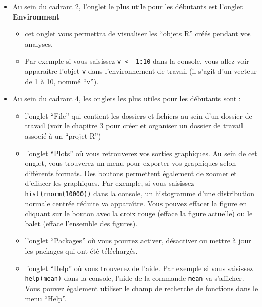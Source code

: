\documentclass[
]{book}
\providecommand{\tightlist}{%
  \setlength{\itemsep}{0pt}\setlength{\parskip}{0pt}}
\begin{document}
\begin{itemize}
\tightlist
\item
  Au sein du cadrant 2, l'onglet le plus utile pour les débutants est l'onglet \textbf{Environment}

  \begin{itemize}
  \tightlist
  \item
    cet onglet vous permettra de visualiser les ``objets R'' créés pendant vos analyses.
  \item
    Par exemple si vous saisissez \texttt{v\ \textless{}-\ 1:10} dans la console, vous allez voir apparaître l'objet \texttt{v} dans l'environnement de travail (il s'agit d'un vecteur de 1 à 10, nommé ``v'').
  \end{itemize}
\item
  Au sein du cadrant 4, les onglets les plus utiles pour les débutants sont :

  \begin{itemize}
  \tightlist
  \item
    l'onglet ``File'' qui contient les dossiers et fichiers au sein d'un dossier de travail (voir le chapitre 3 pour créer et organiser un dossier de travail associé à un ``projet R'')
  \item
    l'onglet ``Plots'' où vous retrouverez vos sorties graphiques. Au sein de cet onglet, vous trouverez un menu pour exporter vos graphiques selon différents formats. Des boutons permettent également de zoomer et d'effacer les graphiques. Par exemple, si vous saisissez \texttt{hist(rnorm(10000))} dans la console, un histogramme d'une distribution normale centrée réduite va apparaître. Vous pouvez effacer la figure en cliquant sur le bouton avec la croix rouge (efface la figure actuelle) ou le balet (efface l'ensemble des figures).
  \item
    l'onglet ``Packages'' où vous pourrez activer, désactiver ou mettre à jour les packages qui ont été téléchargés.
  \item
    l'onglet ``Help'' où vous trouverez de l'aide. Par exemple si vous saisissez \texttt{help(mean)} dans la console, l'aide de la commande \texttt{mean} va s'afficher. Vous pouvez également utiliser le champ de recherche de fonctions dans le menu ``Help''.
  \end{itemize}
\end{itemize}
\end{document}
